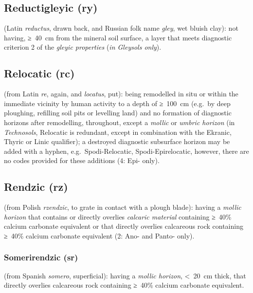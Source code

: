\documentclass[
  letterpaper,
  DIV=11,
  numbers=noendperiod]{scrreprt}
\begin{document}
\hypertarget{reductigleyic-ry}{%
\subsection{Reductigleyic (ry)}\label{reductigleyic-ry}}

(Latin \emph{reductus}, drawn back, and Russian folk name \emph{gley},
wet bluish clay): not having, ≥~40~cm from the mineral soil surface, a
layer that meets diagnostic criterion 2 of the \emph{gleyic properties}
(\emph{in Gleysols only}).

\hypertarget{relocatic-rc}{%
\subsection{Relocatic (rc)}\label{relocatic-rc}}

(from Latin \emph{re}, again, and \emph{locatus}, put): being remodelled
in situ or within the immediate vicinity by human activity to a depth of
≥~100~cm (e.g.~by deep ploughing, refilling soil pits or levelling land)
and no formation of diagnostic horizons after remodelling, throughout,
except a \emph{mollic} or \emph{umbric horizon} (in \emph{Technosols},
Relocatic is redundant, except in combination with the Ekranic, Thyric
or Linic qualifier); a destroyed diagnostic subsurface horizon may be
added with a hyphen, e.g.~Spodi-Relocatic, Spodi-Epirelocatic, however,
there are no codes provided for these additions (4: Epi- only).

\hypertarget{rendzic-rz}{%
\subsection{Rendzic (rz)}\label{rendzic-rz}}

(from Polish \emph{rzendzic}, to grate in contact with a plough blade):
having a \emph{mollic horizon} that contains or directly overlies
\emph{calcaric material} containing ≥~40\% calcium carbonate equivalent
or that directly overlies calcareous rock containing ≥~40\% calcium
carbonate equivalent (2: Ano- and Panto- only).

\hypertarget{somerirendzic-sr}{%
\subsubsection{Somerirendzic (sr)}\label{somerirendzic-sr}}

(from Spanish \emph{somero}, superficial): having a \emph{mollic
horizon}, \textless~20~cm thick, that directly overlies calcareous rock
containing ≥~40\% calcium carbonate equivalent.
\end{document}
